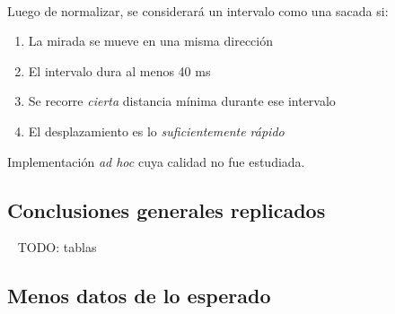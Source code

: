 \documentclass[aspectratio=169]{beamer}
\begin{document}
\begin{frame}{~}

  Luego de normalizar, se considerará un intervalo como una sacada si:
  \begin{enumerate}
    \item La mirada se mueve en una misma dirección
    \item El intervalo dura al menos 40 ms
    \item Se recorre \textit{cierta} distancia mínima durante ese intervalo
    \item El desplazamiento es lo \textit{suficientemente rápido}
  \end{enumerate}
  Implementación \textit{ad hoc} cuya calidad no fue estudiada.

\end{frame}

\subsection{Conclusiones generales replicados}

\begin{frame}{~}
TODO: tablas
\end{frame}

\subsection{Menos datos de lo esperado}
\end{document}

